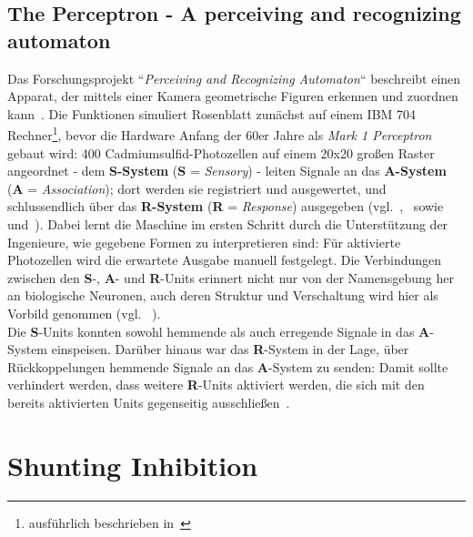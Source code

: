 \subsection*{The Perceptron - A perceiving and recognizing automaton}
Das Forschungsprojekt ``\textit{Perceiving and Recognizing Automaton}`` beschreibt einen Apparat, der mittels einer Kamera geometrische Figuren erkennen und zuordnen kann~\cite[3]{Ros57}.
Die Funktionen simuliert Rosenblatt zunächst auf einem IBM 704 Rechner\footnote{
    ausführlich beschrieben in~\cite{Ros60}
}, bevor  die Hardware Anfang der 60er Jahre als \textit{Mark 1 Perceptron} gebaut wird: 400 Cadmiumsulfid-Photozellen auf einem 20x20 großen Raster angeordnet - dem \textbf{S-System} (\textbf{S} = \textit{Sensory}) - leiten Signale an das \textbf{A-System} (\textbf{A} = \textit{Association}); dort werden sie registriert und ausgewertet, und schlussendlich über das \textbf{R-System} (\textbf{R} = \textit{Response}) ausgegeben (vgl.~\cite[4 f.]{Ros57},~\cite[389 f.]{Ros58} sowie~\cite[193, ``Frank Rosenblatt]{Bis06} und~\cite[196, Figure 4.8]{Bis06}).
Dabei lernt die Maschine im ersten Schritt durch die Unterstützung der Ingenieure, wie gegebene Formen zu interpretieren sind: Für aktivierte Photozellen wird die erwartete Ausgabe manuell festgelegt.
Die Verbindungen zwischen den \textbf{S}-, \textbf{A}- und \textbf{R}-Units erinnert nicht nur von der Namensgebung her an biologische Neuronen, auch deren Struktur und Verschaltung wird hier als Vorbild genommen (vgl. ~\cite[4]{Ros62}).\\

Die \textbf{S}-Units konnten sowohl hemmende als auch erregende Signale in das \textbf{A}-System einspeisen. Darüber hinaus war das \textbf{R}-System in der Lage, über Rückkoppelungen hemmende Signale an das \textbf{A}-System zu senden: Damit sollte verhindert werden, dass weitere \textbf{R}-Units aktiviert werden, die sich mit den bereits aktivierten Units gegenseitig ausschließen~\cite[4 f.]{Ros57}.



\section{Shunting Inhibition}\label{appendix:shuntinginhibition}
